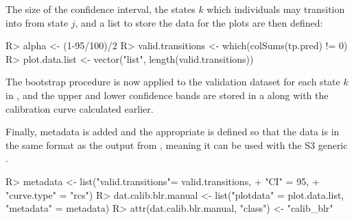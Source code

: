 \documentclass[nojss]{jss}
\begin{document}
The size of the confidence interval, the states $k$ which individuals may transition into from state $j$, and a list to store the data for the plots are then defined:

\begin{Schunk}
\begin{Sinput}
R> alpha <- (1-95/100)/2
R> valid.transitions <- which(colSums(tp.pred) != 0)
R> plot.data.list <- vector("list", length(valid.transitions))
\end{Sinput}
\end{Schunk}

The bootstrap procedure is now applied to the validation dataset  for each state $k$ in , and the upper and lower confidence bands are stored in a  along with the calibration curve calculated earlier.

\begin{Schunk}
\end{Schunk}

Finally, metadata is added and the appropriate  is defined so that the data is in the same format as the output from , meaning it can be used with the S3 generic .

\begin{Schunk}
\begin{Sinput}
R> metadata <- list("valid.transitions"= valid.transitions,
+                   "CI" = 95,
+                   "curve.type" = "rcs")
R> dat.calib.blr.manual <- list("plotdata" = plot.data.list, "metadata" = metadata)
R> attr(dat.calib.blr.manual, "class") <- "calib_blr"
\end{Sinput}
\end{Schunk}
\end{document}
